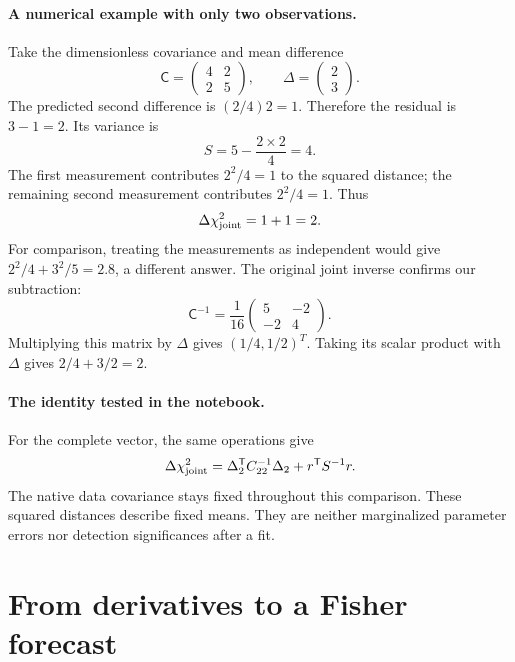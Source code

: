 \documentclass[11pt]{article}
\newcommand{\Cov}{\mathsf C}
\newcommand{\T}{^{\mathsf T}}
\begin{document}
\paragraph{A numerical example with only two observations.}
Take the dimensionless covariance and mean difference
\begin{equation}
 \Cov=\begin{pmatrix}4&2\\2&5\end{pmatrix},
 \qquad \Delta=\begin{pmatrix}2\\3\end{pmatrix}.
\end{equation}
The predicted second difference is $(2/4)2=1$. Therefore the residual is
$3-1=2$. Its variance is
\begin{equation}
 S=5-\frac{2\times2}{4}=4.
\end{equation}
The first measurement contributes $2^2/4=1$ to the squared distance; the
remaining second measurement contributes $2^2/4=1$. Thus
\begin{equation}
 \Delta\chi^2_{\rm joint}=1+1=2.
\end{equation}
For comparison, treating the measurements as independent would give
$2^2/4+3^2/5=2.8$, a different answer. The original joint inverse confirms
our subtraction:
\begin{equation}
 \Cov^{-1}=\frac1{16}\begin{pmatrix}5&-2\\-2&4\end{pmatrix}.
\end{equation}
Multiplying this matrix by $\Delta$ gives $(1/4,1/2)^T$. Taking its scalar
product with $\Delta$ gives $2/4+3/2=2$.

\paragraph{The identity tested in the notebook.}
For the complete vector, the same operations give
\begin{equation}
 \Delta\chi^2_{\rm joint}
 =\Delta_2\T C_{22}^{-1}\Delta_2+r\T S^{-1}r.
\end{equation}
The native data covariance stays fixed throughout this comparison. These
squared distances describe fixed means. They are neither marginalized
parameter errors nor detection significances after a fit.

\section{From derivatives to a Fisher forecast}
\end{document}
